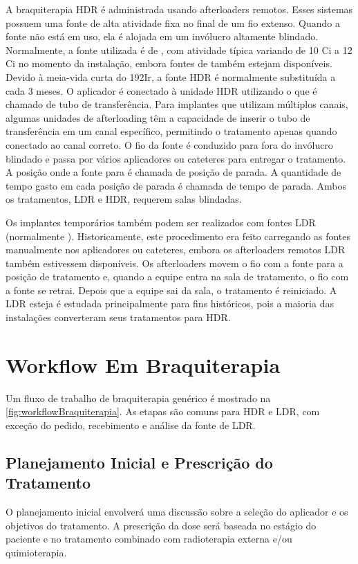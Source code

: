 \documentclass[11pt,a4paper]{article}
\begin{document}
	A braquiterapia HDR é administrada usando afterloaders remotos. Esses sistemas possuem uma fonte de alta atividade fixa no final de um fio extenso. Quando a fonte não está em uso, ela é alojada em um invólucro altamente blindado. Normalmente, a fonte utilizada é de , com atividade típica variando de 10 Ci a 12 Ci no momento da instalação, embora fontes de  também estejam disponíveis. Devido à meia-vida curta do 192Ir, a fonte HDR é normalmente substituída a cada 3 meses. O aplicador é conectado à unidade HDR utilizando o que é chamado de tubo de transferência. Para implantes que utilizam múltiplos canais, algumas unidades de afterloading têm a capacidade de inserir o tubo de transferência em um canal específico, permitindo o tratamento apenas quando conectado ao canal correto. O fio da fonte é conduzido para fora do invólucro blindado e passa por vários aplicadores ou cateteres para entregar o tratamento. A posição onde a fonte para é chamada de posição de parada. A quantidade de tempo gasto em cada posição de parada é chamada de tempo de parada. Ambos os tratamentos, LDR e HDR, requerem salas blindadas.

	Os implantes temporários também podem ser realizados com fontes LDR (normalmente ). Historicamente, este procedimento era feito carregando as fontes manualmente nos aplicadores ou cateteres, embora os afterloaders remotos LDR também estivessem disponíveis. Os afterloaders movem o fio com a fonte para a posição de tratamento e, quando a equipe entra na sala de tratamento, o fio com a fonte se retrai. Depois que a equipe sai da sala, o tratamento é reiniciado. A LDR esteja é estudada principalmente para fins históricos, pois a maioria das instalações converteram seus tratamentos para HDR.

\section{Workflow Em Braquiterapia}

	Um fluxo de trabalho de braquiterapia genérico é mostrado na \ref{fig:workflowBraquiterapia}. As etapas são comuns para HDR e LDR, com exceção do pedido, recebimento e análise da fonte de LDR.
	
\subsection*{Planejamento Inicial e Prescrição do Tratamento}

	O planejamento inicial envolverá uma discussão sobre a seleção do aplicador e os objetivos do tratamento. A prescrição da dose será baseada no estágio do paciente e no tratamento combinado com radioterapia externa e/ou quimioterapia.
\end{document}

